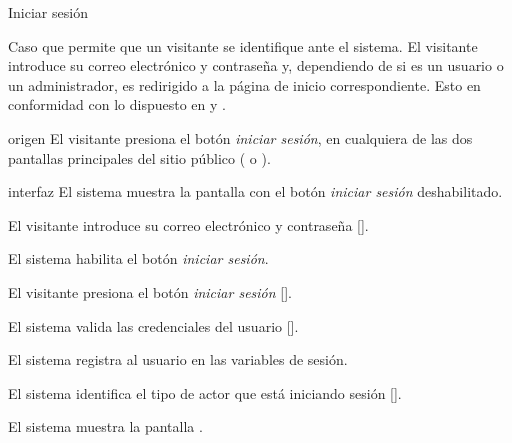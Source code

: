 %
%

{Iniciar sesión}
{
  Caso que permite que un visitante se identifique ante el sistema. El
  visitante introduce su correo electrónico y contraseña y, dependiendo de
  si es un usuario o un administrador, es redirigido a la página de
  inicio correspondiente. Esto en conformidad con lo dispuesto en
   y
  .

  \begin{trayectoriaPrincipal}

    \item[origen] El visitante presiona el botón \textit{iniciar sesión}, en
      cualquiera de las dos pantallas principales del sitio público
      ( o
      ).

    \item[interfaz] El sistema muestra la pantalla
       con el botón \textit{iniciar sesión}
      deshabilitado.

    \item El visitante introduce su correo electrónico y contraseña
      [].

    \item El sistema habilita el botón \textit{iniciar sesión}.

    \item El visitante presiona el botón \textit{iniciar sesión}
      [].

    \item El sistema valida las credenciales del usuario
      [].

    \item El sistema registra al usuario en las variables de sesión.

    \item El sistema identifica el tipo de actor que está iniciando
      sesión [].

    \item El sistema muestra la pantalla .

  \end{trayectoriaPrincipal}

}
